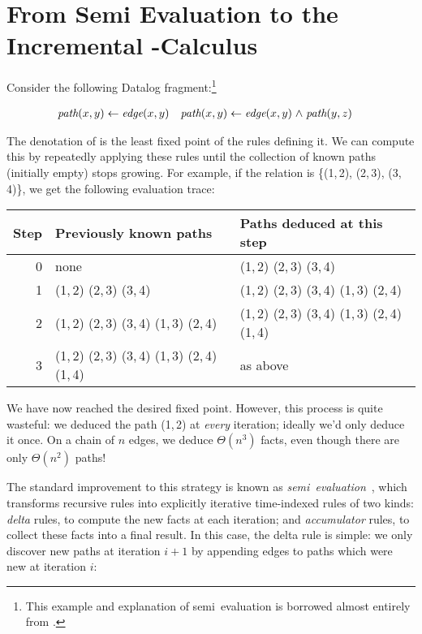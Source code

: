 \section{From Semi\naive{} Evaluation to the Incremental \boldfn-Calculus}
\label{sec:seminaive-and-ilc}

Consider the following Datalog fragment:\footnote{This example and explanation
  of semi\naive\ evaluation is borrowed almost entirely from
  \citet{DBLP:conf/esop/Alvarez-Picallo19}.}

\begin{align*}
  \name{path}(x,y) &\gets \name{edge}(x,y)
  &
  \name{path}(x,y) &\gets \name{edge}(x,y) \wedge \name{path}(y,z)
\end{align*}

\noindent
The denotation of  is the least fixed point of the rules defining
it.
We can compute this by repeatedly applying these rules until the collection
of known paths (initially empty) stops growing.
%
For example, if the  relation is \{(1,\,2), (2,\,3), (3,\,4)\}, we
get the following evaluation trace:

\begin{center}
  \setlength\tabcolsep{1em}
  \def\arraystretch{1.1}
  \begin{tabular}{@{}rll@{}}
    Step
    & Previously known paths
    & Paths deduced at this step
    \\\midrule
    0
    & none
    & (1,\,2) (2,\,3) (3,\,4)
    \\
    1
    & (1,\,2) (2,\,3) (3,\,4)
    & (1,\,2) (2,\,3) (3,\,4) (1,\,3) (2,\,4)
    \\
    2
    & (1,\,2) (2,\,3) (3,\,4) (1,\,3) (2,\,4)
    & (1,\,2) (2,\,3) (3,\,4) (1,\,3) (2,\,4) (1,\,4)
    \\
    3
    & (1,\,2) (2,\,3) (3,\,4) (1,\,3) (2,\,4) (1,\,4)
    & as above
  \end{tabular}
\end{center}

\noindent We have now reached the desired fixed point. However, this process is
quite wasteful: we deduced the path (1,\,2) at \emph{every} iteration; ideally
we'd only deduce it once. On a chain of $n$ edges, we deduce $\Theta(n^3)$
facts, even though there are only $\Theta(n^2)$ paths!

The standard improvement to this strategy is known as
\emph{semi\naive\ evaluation}~\cite{seminaive}, which transforms recursive rules
into explicitly iterative time-indexed rules of two kinds: \emph{delta} rules,
to compute the new facts at each iteration; and \emph{accumulator} rules, to
collect these facts into a final result.
%
%
\noindent In this case, the delta rule is simple: we only discover new paths at
iteration $i+1$ by appending edges to paths which were new at iteration $i$:

